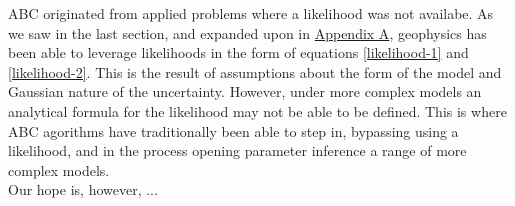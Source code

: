 ABC originated from applied problems where a likelihood was not availabe. As we saw in the last section, and expanded upon in \hyperref[AppendixA]{Appendix A}, geophysics has been able to leverage likelihoods in the form of equations \ref{likelihood-1} and \ref{likelihood-2}. This is the result of assumptions about the form of the model and Gaussian nature of the uncertainty. However, under more complex models an analytical formula for the likelihood may not be able to be defined. This is where ABC agorithms have traditionally been able to step in, bypassing using a likelihood, and in the process opening parameter inference a range of more complex models. \\

Our hope is, however, ...

